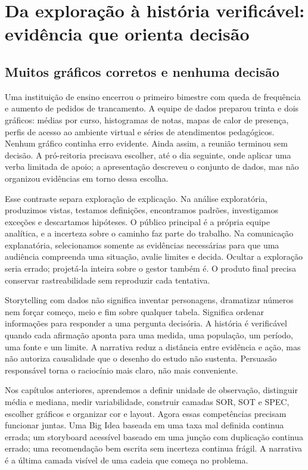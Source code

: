 \chapter[Da exploração à história verificável]{Da exploração à história verificável: evidência que orienta decisão}

\section{Muitos gráficos corretos e nenhuma decisão}

Uma instituição de ensino encerrou o primeiro bimestre com queda de frequência e aumento de pedidos de trancamento. A equipe de dados preparou trinta e dois gráficos: médias por curso, histogramas de notas, mapas de calor de presença, perfis de acesso ao ambiente virtual e séries de atendimentos pedagógicos. Nenhum gráfico continha erro evidente. Ainda assim, a reunião terminou sem decisão. A pró-reitoria precisava escolher, até o dia seguinte, onde aplicar uma verba limitada de apoio; a apresentação descreveu o conjunto de dados, mas não organizou evidências em torno dessa escolha.

Esse contraste separa exploração de explicação. Na análise exploratória, produzimos vistas, testamos definições, encontramos padrões, investigamos exceções e descartamos hipóteses. O público principal é a própria equipe analítica, e a incerteza sobre o caminho faz parte do trabalho. Na comunicação explanatória, selecionamos somente as evidências necessárias para que uma audiência compreenda uma situação, avalie limites e decida. Ocultar a exploração seria errado; projetá-la inteira sobre o gestor também é. O produto final precisa conservar rastreabilidade sem reproduzir cada tentativa.

Storytelling com dados não significa inventar personagens, dramatizar números nem forçar começo, meio e fim sobre qualquer tabela. Significa ordenar informações para responder a uma pergunta decisória. A história é verificável quando cada afirmação aponta para uma medida, uma população, um período, uma fonte e um limite. A narrativa reduz a distância entre evidência e ação, mas não autoriza causalidade que o desenho do estudo não sustenta. Persuasão responsável torna o raciocínio mais claro, não mais conveniente.

Nos capítulos anteriores, aprendemos a definir unidade de observação, distinguir média e mediana, medir variabilidade, construir camadas SOR, SOT e SPEC, escolher gráficos e organizar cor e layout. Agora essas competências precisam funcionar juntas. Uma Big Idea baseada em uma taxa mal definida continua errada; um storyboard acessível baseado em uma junção com duplicação continua errado; uma recomendação bem escrita sem incerteza continua frágil. A narrativa é a última camada visível de uma cadeia que começa no problema.

